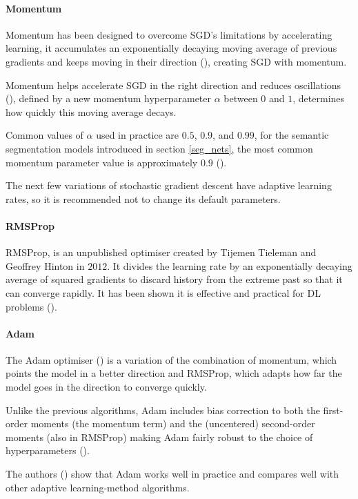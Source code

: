 \paragraph{Momentum}
Momentum has been designed to overcome \gls{SGD}'s limitations by accelerating learning, it accumulates an exponentially decaying moving average of previous gradients and keeps moving in their direction (\cite{GoodBengCour16}), creating \gls{SGD} with momentum. 

Momentum helps accelerate \gls{SGD} in the right direction and reduces oscillations (\cite{ruder2017overview}), defined by a new momentum hyperparameter $\alpha$ between $0$ and $1$, determines how quickly this moving average decays.

Common values of $\alpha$ used in practice are $0.5$, $0.9$, and $0.99$, for the semantic segmentation models introduced in section \ref{seg_nets}, the most common momentum parameter value is approximately $0.9$ (\cite{sultana2020106062}).

The next few variations of stochastic gradient descent have adaptive learning rates, so it is recommended not to change its default parameters.

\paragraph{\gls{RMSProp}}
\gls{RMSProp}, is an unpublished optimiser created by Tijemen Tieleman and Geoffrey Hinton in $2012$. It divides the learning rate by an exponentially decaying average of squared gradients to discard history from the extreme past so that it can converge rapidly. It has been shown it is effective and practical for \gls{DL} problems (\cite{GoodBengCour16}).

\paragraph{\gls{Adam}}
The \gls{Adam} optimiser (\cite{kingma2017adam}) is a variation of the combination of momentum, which points the model in a better direction and \gls{RMSProp}, which adapts how far the model goes in the direction to converge quickly.

Unlike the previous algorithms, \gls{Adam} includes bias correction to both the ﬁrst-order moments (the momentum term) and the (uncentered) second-order moments (also in \gls{RMSProp}) making \gls{Adam} fairly robust to the choice of hyperparameters (\cite{GoodBengCour16}).

The authors (\cite{kingma2017adam}) show that \gls{Adam} works well in practice and compares well with other adaptive learning-method algorithms.
